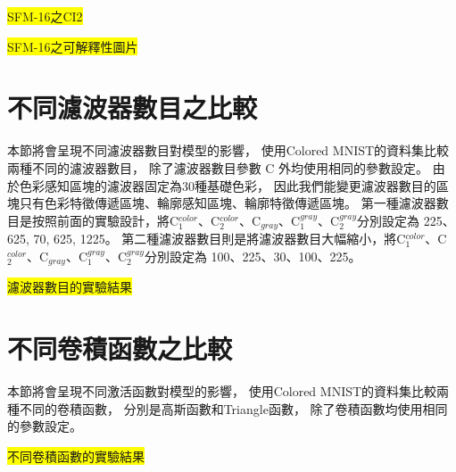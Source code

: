 \documentclass[class=NCU\_thesis, crop=false]{standalone}
\begin{document}
    \colorbox {yellow}{SFM-16之CI2}

    \colorbox {yellow}{SFM-16之可解釋性圖片}

    \section{不同濾波器數目之比較}
    本節將會呈現不同濾波器數目對模型的影響，
    使用Colored MNIST的資料集比較兩種不同的濾波器數目，
    除了濾波器數目參數 C 外均使用相同的參數設定。
    由於色彩感知區塊的濾波器固定為30種基礎色彩，
    因此我們能變更濾波器數目的區塊只有色彩特徵傳遞區塊、輪廓感知區塊、輪廓特徵傳遞區塊。
    第一種濾波器數目是按照前面的實驗設計，將C$^{color}_{1}$、C$^{color}_{2}$、C$_{gray}$、C$^{gray}_{1}$、C$^{gray}_{2}$分別設定為 225、625, 70, 625, 1225。
    第二種濾波器數目則是將濾波器數目大幅縮小，將C$^{color}_{1}$、C$^{color}_{2}$、C$_{gray}$、C$^{gray}_{1}$、C$^{gray}_{2}$分別設定為 100、225、30、100、225。

    \colorbox{yellow}{濾波器數目的實驗結果}

    \section{不同卷積函數之比較}
    本節將會呈現不同激活函數對模型的影響，
    使用Colored MNIST的資料集比較兩種不同的卷積函數，
    分別是高斯函數和Triangle函數，
    除了卷積函數均使用相同的參數設定。

    \colorbox{yellow}{不同卷積函數的實驗結果}
\end{document}
